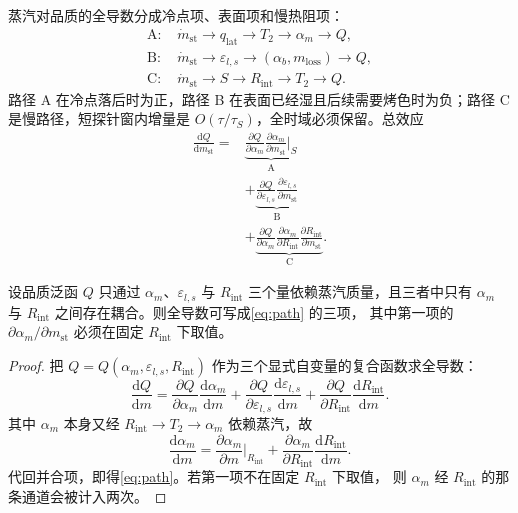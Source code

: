 蒸汽对品质的全导数分成冷点项、表面项和慢热阻项：
\begin{align}
\text{A: }& \dot m_{\mathrm{st}}\to q_{\mathrm{lat}}\to T_2\to\alpha_m\to Q,\\
\text{B: }& \dot m_{\mathrm{st}}\to\varepsilon_{l,s}\to(\alpha_b,m_{\mathrm{loss}})\to Q,\\
\text{C: }& \dot m_{\mathrm{st}}\to S\to R_{\mathrm{int}}\to T_2\to Q.
\end{align}
路径 A 在冷点落后时为正，路径 B 在表面已经湿且后续需要烤色时为负；路径 C 是慢路径，短探针窗内增量是 \(O(\tau/\tau_S)\)，全时域必须保留。总效应
\begin{equation}
\label{eq:path}
\begin{aligned}
\frac{\mathrm{d}Q}{\mathrm{d}m_{\mathrm{st}}}
={}&\underbrace{\frac{\partial Q}{\partial\alpha_m}\frac{\partial\alpha_m}{\partial m_{\mathrm{st}}}\Big|_{\!S}}_{\text{A}}\\
&+\underbrace{\frac{\partial Q}{\partial\varepsilon_{l,s}}\frac{\partial\varepsilon_{l,s}}{\partial m_{\mathrm{st}}}}_{\text{B}}\\
&+\underbrace{\frac{\partial Q}{\partial\alpha_m}\frac{\partial\alpha_m}{\partial R_{\mathrm{int}}}\frac{\partial R_{\mathrm{int}}}{\partial m_{\mathrm{st}}}}_{\text{C}}.
\end{aligned}
\end{equation}

\begin{proposition}[路径加性]
\label{prop:pathadd}
设品质泛函 \(Q\) 只通过 \(\alpha_m\)、\(\varepsilon_{l,s}\) 与 \(R_{\mathrm{int}}\) 三个量依赖蒸汽质量，且三者中只有
\(\alpha_m\) 与 \(R_{\mathrm{int}}\) 之间存在耦合。则全导数可写成\eqref{eq:path} 的三项，
其中第一项的 \(\partial\alpha_m/\partial m_{\mathrm{st}}\) 必须在固定 \(R_{\mathrm{int}}\) 下取值。
\end{proposition}

\begin{proof}
把 \(Q=Q(\alpha_m,\varepsilon_{l,s},R_{\mathrm{int}})\) 作为三个显式自变量的复合函数求全导数：
\[
\frac{\mathrm{d}Q}{\mathrm{d}m}
=\frac{\partial Q}{\partial\alpha_m}\frac{\mathrm{d}\alpha_m}{\mathrm{d}m}
+\frac{\partial Q}{\partial\varepsilon_{l,s}}\frac{\mathrm{d}\varepsilon_{l,s}}{\mathrm{d}m}
+\frac{\partial Q}{\partial R_{\mathrm{int}}}\frac{\mathrm{d}R_{\mathrm{int}}}{\mathrm{d}m}.
\]
其中 \(\alpha_m\) 本身又经 \(R_{\mathrm{int}}\to T_2\to\alpha_m\) 依赖蒸汽，故
\[
\frac{\mathrm{d}\alpha_m}{\mathrm{d}m}
=\frac{\partial\alpha_m}{\partial m}\Big|_{R_{\mathrm{int}}}
+\frac{\partial\alpha_m}{\partial R_{\mathrm{int}}}\frac{\mathrm{d}R_{\mathrm{int}}}{\mathrm{d}m}.
\]
代回并合项，即得\eqref{eq:path}。若第一项不在固定 \(R_{\mathrm{int}}\) 下取值，
则 \(\alpha_m\) 经 \(R_{\mathrm{int}}\) 的那条通道会被计入两次。
\end{proof}

